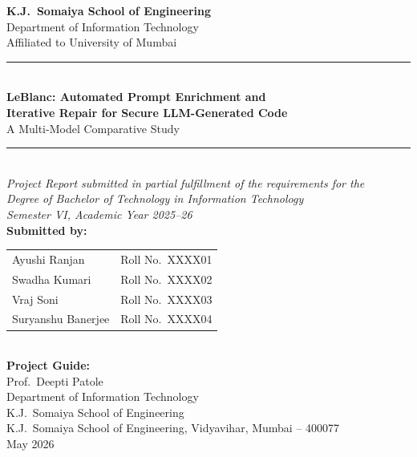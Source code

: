 \documentclass[12pt,a4paper]{report}
\begin{document}
\onehalfspacing

\begin{titlepage}
\centering
\vspace*{0.2in}
{\Large\bfseries K.J.\ Somaiya School of Engineering}\\[0.08in]
{\large Department of Information Technology}\\[0.04in]
{\normalsize Affiliated to University of Mumbai}\\[0.35in]

\rule{\linewidth}{1.2pt}\\[0.18in]
{\LARGE\bfseries LeBlanc: Automated Prompt Enrichment and\\[0.1in]
Iterative Repair for Secure LLM-Generated Code}\\[0.12in]
{\large A Multi-Model Comparative Study}\\[0.18in]
\rule{\linewidth}{1.2pt}\\[0.28in]

{\normalsize\itshape Project Report submitted in partial fulfillment of the
requirements for the\\[0.04in]
Degree of Bachelor of Technology in Information Technology\\[0.04in]
Semester VI, Academic Year 2025--26}\\[0.35in]

{\normalsize\bfseries Submitted by:}\\[0.12in]
\begin{tabular}{@{}ll@{}}
  Ayushi Ranjan       & Roll No.\ XXXX01 \\[0.04in]
  Swadha Kumari       & Roll No.\ XXXX02 \\[0.04in]
  Vraj Soni           & Roll No.\ XXXX03 \\[0.04in]
  Suryanshu Banerjee  & Roll No.\ XXXX04 \\
\end{tabular}\\[0.35in]

{\normalsize\bfseries Project Guide:}\\[0.08in]
{\normalsize Prof.\ Deepti Patole}\\[0.04in]
{\normalsize Department of Information Technology}\\[0.04in]
{\normalsize K.J.\ Somaiya School of Engineering}\\[0.4in]


{\normalsize K.J.\ Somaiya School of Engineering, Vidyavihar, Mumbai -- 400077}\\[0.06in]
{\normalsize May 2026}
\end{titlepage}
\end{document}
